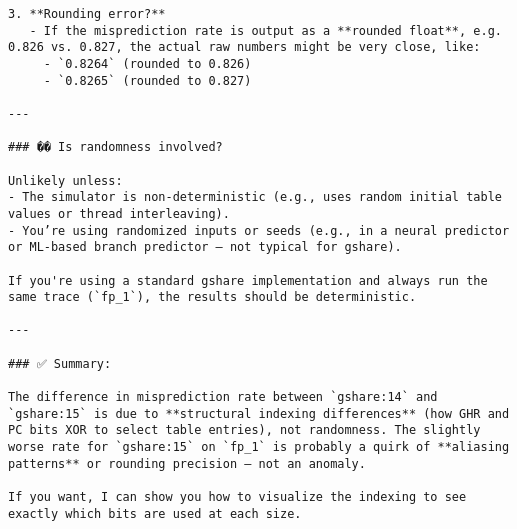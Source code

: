 \documentclass[11pt]{article}
\begin{document}
\begin{Verbatim}[fontsize=\tiny, breaklines=true]
3. **Rounding error?**
   - If the misprediction rate is output as a **rounded float**, e.g. 0.826 vs. 0.827, the actual raw numbers might be very close, like:
     - `0.8264` (rounded to 0.826)
     - `0.8265` (rounded to 0.827)

---

### �� Is randomness involved?

Unlikely unless:
- The simulator is non-deterministic (e.g., uses random initial table values or thread interleaving).
- You’re using randomized inputs or seeds (e.g., in a neural predictor or ML-based branch predictor — not typical for gshare).

If you're using a standard gshare implementation and always run the same trace (`fp_1`), the results should be deterministic.

---

### ✅ Summary:

The difference in misprediction rate between `gshare:14` and `gshare:15` is due to **structural indexing differences** (how GHR and PC bits XOR to select table entries), not randomness. The slightly worse rate for `gshare:15` on `fp_1` is probably a quirk of **aliasing patterns** or rounding precision — not an anomaly.

If you want, I can show you how to visualize the indexing to see exactly which bits are used at each size.
\end{Verbatim}

\thispagestyle{ack_footer}
\end{document}
